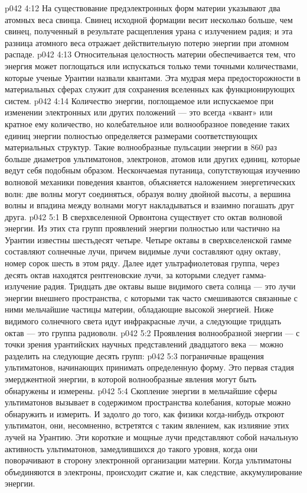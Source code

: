 \vs p042 4:12 \pc На существование предэлектронных форм материи указывают два атомных веса свинца. Свинец исходной формации весит несколько больше, чем свинец, полученный в результате расщепления урана с излучением радия; и эта разница атомного веса отражает действительную потерю энергии при атомном распаде.
\vs p042 4:13 \pc Относительная целостность материи обеспечивается тем, что энергия может поглощаться или испускаться только теми точными количествами, которые ученые Урантии назвали квантами. Эта мудрая мера предосторожности в материальных сферах служит для сохранения вселенных как функционирующих систем.
\vs p042 4:14 Количество энергии, поглощаемое или испускаемое при изменении электронных или других положений --- это всегда «квант» или кратное ему количество, но колебательное или волнообразное поведение таких единиц энергии полностью определяется размерами соответствующих материальных структур. Такие волнообразные пульсации энергии в 860 раз больше диаметров ультиматонов, электронов, атомов или других единиц, которые ведут себя подобным образом. Нескончаемая путаница, сопутствующая изучению волновой механики поведения квантов, объясняется наложением энергетических волн: две волны могут соединяться, образуя волну двойной высоты, а вершина волны и впадина между волнами могут накладываться и взаимно погашать друг друга.
\vs p042 5:1 В сверхвселенной Орвонтона существует сто октав волновой энергии. Из этих ста групп проявлений энергии полностью или частично на Урантии известны шестьдесят четыре. Четыре октавы в сверхвселенской гамме составляют солнечные лучи, причем видимые лучи составляют одну октаву, номер сорок шесть в этом ряду. Далее идет ультрафиолетовая группа, через десять октав находятся рентгеновские лучи, за которыми следует гамма\hyp{}излучение радия. Тридцать две октавы выше видимого света солнца --- это лучи энергии внешнего пространства, с которыми так часто смешиваются связанные с ними мельчайшие частицы материи, обладающие высокой энергией. Ниже видимого солнечного света идут инфракрасные лучи, а следующие тридцать октав --- это группа радиоволн.
\vs p042 5:2 \pc Проявления волнообразной энергии --- с точки зрения урантийских научных представлений двадцатого века --- можно разделить на следующие десять групп:
\vs p042 5:3 \bibnobreakspace {} пограничные вращения ультиматонов, начинающих принимать определенную форму. Это первая стадия эмерджентной энергии, в которой волнообразные явления могут быть обнаружены и измерены.
\vs p042 5:4 \bibnobreakspace {} Скопление энергии в мельчайшие сферы ультиматонов вызывает в содержимом пространства колебания, которые можно обнаружить и измерить. И задолго до того, как физики когда\hyp{}нибудь откроют ультиматон, они, несомненно, встретятся с таким явлением, как излияние этих лучей на Урантию. Эти короткие и мощные лучи представляют собой начальную активность ультиматонов, замедлившихся до такого уровня, когда они поворачивают в сторону электронной организации материи. Когда ультиматоны объединяются в электроны, происходит сжатие и, как следствие, аккумулирование энергии.
